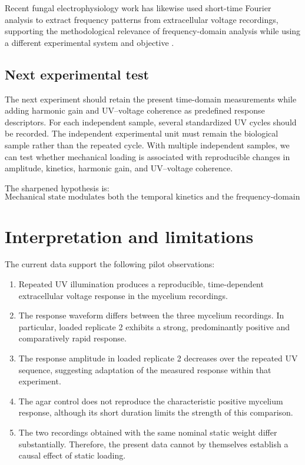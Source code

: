 \documentclass[11pt,a4paper]{article}
\begin{document}
Recent fungal electrophysiology work has likewise used short-time Fourier analysis to extract frequency patterns from extracellular voltage recordings, supporting the methodological relevance of frequency-domain analysis while using a different experimental system and objective \cite{Buffi2025}.

\subsection{Next experimental test}

The next experiment should retain the present time-domain measurements while adding harmonic gain and UV--voltage coherence as predefined response descriptors. For each independent sample, several standardized UV cycles should be recorded. The independent experimental unit must remain the biological sample rather than the repeated cycle. With multiple independent samples, we can test whether mechanical loading is associated with reproducible changes in amplitude, kinetics, harmonic gain, and UV--voltage coherence.

The sharpened hypothesis is:
\[
\boxed{\text{Mechanical state modulates both the temporal kinetics and the frequency-domain coupling of mycelial electrical responses to UV stimulation.}}
\]

\section{Interpretation and limitations}

The current data support the following pilot observations:

\begin{enumerate}
    \item Repeated UV illumination produces a reproducible,
    time-dependent extracellular voltage response in the mycelium recordings.
    \item The response waveform differs between the three mycelium
    recordings. In particular, loaded replicate 2 exhibits a strong,
    predominantly positive and comparatively rapid response.
    \item The response amplitude in loaded replicate 2 decreases over the
    repeated UV sequence, suggesting adaptation of the measured response
    within that experiment.
    \item The agar control does not reproduce the characteristic positive
    mycelium response, although its short duration limits the strength of
    this comparison.
    \item The two recordings obtained with the same nominal static weight
    differ substantially. Therefore, the present data cannot by themselves
    establish a causal effect of static loading.
\end{enumerate}
\end{document}
